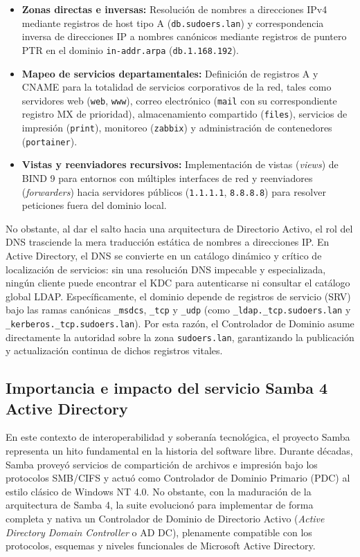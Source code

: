 \begin{itemize}
    \item \textbf{Zonas directas e inversas:} Resolución de nombres a direcciones IPv4 mediante registros de host tipo A (\texttt{db.sudoers.lan}) y correspondencia inversa de direcciones IP a nombres canónicos mediante registros de puntero PTR en el dominio \texttt{in-addr.arpa} (\texttt{db.1.168.192}).
    \item \textbf{Mapeo de servicios departamentales:} Definición de registros A y CNAME para la totalidad de servicios corporativos de la red, tales como servidores web (\texttt{web}, \texttt{www}), correo electrónico (\texttt{mail} con su correspondiente registro MX de prioridad), almacenamiento compartido (\texttt{files}), servicios de impresión (\texttt{print}), monitoreo (\texttt{zabbix}) y administración de contenedores (\texttt{portainer}).
    \item \textbf{Vistas y reenviadores recursivos:} Implementación de vistas (\textit{views}) de BIND 9 para entornos con múltiples interfaces de red y reenviadores (\textit{forwarders}) hacia servidores públicos (\texttt{1.1.1.1}, \texttt{8.8.8.8}) para resolver peticiones fuera del dominio local.
\end{itemize}

No obstante, al dar el salto hacia una arquitectura de Directorio Activo, el rol del DNS trasciende la mera traducción estática de nombres a direcciones IP. En Active Directory, el DNS se convierte en un catálogo dinámico y crítico de localización de servicios: sin una resolución DNS impecable y especializada, ningún cliente puede encontrar el KDC para autenticarse ni consultar el catálogo global LDAP. Específicamente, el dominio depende de registros de servicio (SRV) bajo las ramas canónicas \texttt{\_msdcs}, \texttt{\_tcp} y \texttt{\_udp} (como \texttt{\_ldap.\_tcp.sudoers.lan} y \texttt{\_kerberos.\_tcp.sudoers.lan}). Por esta razón, el Controlador de Dominio asume directamente la autoridad sobre la zona \texttt{sudoers.lan}, garantizando la publicación y actualización continua de dichos registros vitales.

\subsection{Importancia e impacto del servicio Samba 4 Active Directory}

En este contexto de interoperabilidad y soberanía tecnológica, el proyecto Samba representa un hito fundamental en la historia del software libre. Durante décadas, Samba proveyó servicios de compartición de archivos e impresión bajo los protocolos SMB/CIFS y actuó como Controlador de Dominio Primario (PDC) al estilo clásico de Windows NT 4.0. No obstante, con la maduración de la arquitectura de Samba 4, la suite evolucionó para implementar de forma completa y nativa un Controlador de Dominio de Directorio Activo (\textit{Active Directory Domain Controller} o AD DC), plenamente compatible con los protocolos, esquemas y niveles funcionales de Microsoft Active Directory.

